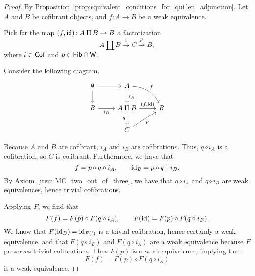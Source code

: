 \documentclass[main.tex]{subfiles}
\begin{document}
\begin{proof}
  By \hyperref[prop:equivalent_conditions_for_quillen_adjunction]{Proposition~\ref*{prop:equivalent_conditions_for_quillen_adjunction}}. Let $A$ and $B$ be cofibrant objects, and $f\colon A \to B$ be a weak equivalence.

  Pick for the map $(f, \mathrm{id})\colon A \amalg B \to B$ a factorization
  \begin{equation*}
    A \amalg B \overset{i}{\to} C \overset{p}{\to} B,
  \end{equation*}
  where $i \in \mathsf{Cof}$ and $p \in \mathsf{Fib} \cap \mathsf{W}$.

  Consider the following diagram.
  \begin{equation*}
    \begin{tikzcd}
      \emptyset
      \arrow[r]
      \arrow[d]
      & A
      \arrow[dr, bend left, "f"]
      \arrow[d, "i_{A}"]
      \\
      B
      \arrow[r, swap, "i_{B}"]
      & A \amalg B
      \arrow[r, "{(f, \id)}"]
      \arrow[d, swap, "q"]
      & B
      \\
      & C
      \arrow[ur, swap, "p"]
    \end{tikzcd}
  \end{equation*}

  Because $A$ and $B$ are cofibrant, $i_{A}$ and $i_{B}$ are cofibrations. Thus, $q \circ i_{A}$ is a cofibration, so $C$ is cofibrant. Furthermore, we have that
  \begin{equation*}
    f = p \circ q \circ i_{A},\qquad \mathrm{id}_{B} = p \circ q \circ i_{B}.
  \end{equation*}
  By \hyperref[item:MC_two_out_of_three]{Axiom~\ref*{item:MC_two_out_of_three}}, we have that $q \circ i_{A}$ and $q \circ i_{B}$ are weak equivalences, hence trivial cofibrations.

  Applying $F$, we find that
  \begin{equation*}
    F(f) = F(p) \circ F(q \circ i_{A}),\qquad F(\mathrm{id}) = F(p) \circ F(q \circ i_{B}).
  \end{equation*}
  We know that $F(\mathrm{id}_{B}) = \mathrm{id}_{F(b)}$ is a trivial cofibration, hence certainly a weak equivalence, and that $F(q \circ i_{B})$ and $F(q \circ i_{A})$ are a weak equivalence because $F$ preserves trivial cofibrations. Thus $F(p)$ is a weak equivalence, implying that
  \begin{equation*}
    F(f) = F(p) \circ F(q \circ i_{A})
  \end{equation*}
  is a weak equivalence.
\end{proof}
\end{document}
